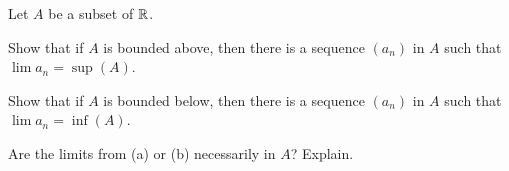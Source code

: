 \ea

\begin{comment}

\ExerciseSolution 

\ba

\item We prove that $(a_n)$ converges to $1$. Let $\epsilon$ be a positive real number. We know there is an $N \in \Z^+$ such that $\frac{1}{N} < \epsilon$. Then if $n \geq N$, 
\[|a_n - 1| = \left|\frac{1}{n}\right| < \frac{1}{N} < \epsilon.\]
Therefore, $\lim a_n = 1$. 

\item We prove that $(a_n)$ has no limit. Let $a = (u,v)$ be a point in $\R^2$ and let $\epsilon$ be a positive real number.  We know that 
\[d_M(a_n,a) = \max\{|2-u|, |n-v|\}.\]
By the Archimedean property, there is $M \in \Z^+$ such that $M - v \geq \epsilon$. So if $n \geq M$ we have 
\[d_M(a_n,a) = \max\{|2-u|, |n-v|\} \geq |n-v| > M-v \geq \epsilon.\] 
So there can be no $N \in \Z^+$ with $d_M(a_n,a) < \epsilon$ whenever $n \geq N$. We conclude that the sequence $(a_n)$ has no limit. 

\item We prove that the sequence $(a_n)$ converges to the constant function $a$ defined by $a(x) = 0$ for all $x \in [0,1]$. Notice that $a_n(x)$ is the linear function connecting the points $(0,0)$ and $\left(1,\frac{1}{n}\right)$. So 
\[d(a_n,a) = \sup\{|a_n(x)-a(x)| \mid x \in [0,1]\} = \left(\frac{1}{n}-0\right| = \frac{1}{n}.\]
Let $\epsilon > 0$. By the Archimedean property, there is an $N \in \Z^+$ such that $N > \frac{1}{\epsilon}$. Then for $n \geq N$ we have 
\[d(a_n,a) = \frac{1}{n} \leq \frac{1}{N} < \epsilon.\]

\ea

\end{comment}


\item Let $A$ be a subset of $\mathbb{R}$.

\ba

\item Show that if $A$ is bounded above, then there is a sequence $(a_n)$ in $A$ such that $\lim a_n = \sup(A)$. 

\item Show that if $A$ is bounded below, then there is a sequence $(a_n)$ in $A$ such that $\lim a_n = \inf(A)$. 

\item Are the limits from (a) or (b) necessarily in $A$? Explain.
\ea

